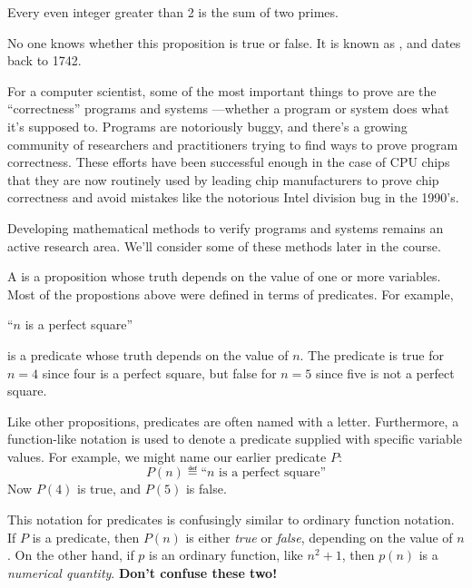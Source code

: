 \begin{proposition}[Goldbach]
Every even integer greater than 2 is the sum of two primes.
\end{proposition}

No one knows whether this proposition is true or false.  It is known as
, and dates back to 1742.

For a computer scientist, some of the most important things to prove are
the ``correctness'' programs and systems ---whether a program or system
does what it's supposed to.  Programs are notoriously buggy, and there's a
growing community of researchers and practitioners trying to find ways to
prove program correctness.  These efforts have been successful enough in
the case of CPU chips that they are now routinely used by leading chip
manufacturers to prove chip correctness and avoid mistakes like the
notorious Intel division bug in the 1990's.

Developing mathematical methods to verify programs and systems remains an
active research area.  We'll consider some of these methods later in the
course.



A  is a proposition whose truth depends on the value of
one or more variables.  Most of the propostions above were defined in
terms of predicates.  For example,
%
\begin{center}
``$n$ is a perfect square''
\end{center}
%
is a predicate whose truth depends on the value of $n$.  The predicate is
true for $n = 4$ since four is a perfect square, but false for $n = 5$
since five is not a perfect square.  

Like other propositions, predicates are often named with a letter.
Furthermore, a function-like notation is used to denote a predicate
supplied with specific variable values.  For example, we might name
our earlier predicate $P$:
%
\[
P(n) \eqdef \text{``$n$ is a perfect square''}
\]
%
Now $P(4)$ is true, and $P(5)$ is false.

This notation for predicates is confusingly similar to ordinary function
notation.  If $P$ is a predicate, then $P(n)$ is either \textit{true} or
\textit{false}, depending on the value of $n$.  On the other hand, if $p$
is an ordinary function, like $n^2 + 1$, then $p(n)$ is a
\textit{numerical quantity}.  \textbf{Don't confuse these two!}

